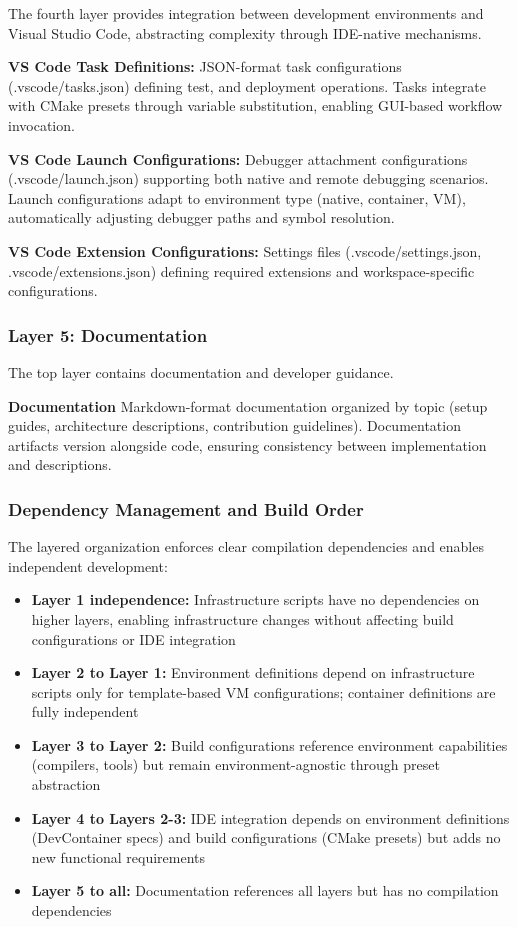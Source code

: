The fourth layer provides integration between development environments and Visual Studio Code, abstracting complexity through IDE-native mechanisms.

\textbf{VS Code Task Definitions:} JSON-format task configurations (.vscode/tasks.json) defining test, and deployment operations.
Tasks integrate with CMake presets through variable substitution, enabling GUI-based workflow invocation.

\begin{sloppypar}
\textbf{VS Code Launch Configurations:} Debugger attachment configurations (.vscode/launch.json) supporting both native and remote debugging scenarios.
Launch configurations adapt to environment type (native, container, VM), automatically adjusting debugger paths and symbol resolution.
\end{sloppypar}

\textbf{VS Code Extension Configurations:} Settings files (.vscode/settings.json, .vscode/extensions.json) defining required extensions and workspace-specific configurations.

\subsubsection{Layer 5: Documentation}

The top layer contains documentation and developer guidance.

\textbf{Documentation} Markdown-format documentation organized by topic (setup guides, architecture descriptions, contribution guidelines).
Documentation artifacts version alongside code, ensuring consistency between implementation and descriptions.

\subsubsection{Dependency Management and Build Order}

The layered organization enforces clear compilation dependencies and enables independent development:
\begin{itemize}
\item \textbf{Layer 1 independence:} Infrastructure scripts have no dependencies on higher layers, enabling infrastructure changes without affecting build configurations or IDE integration
\item \textbf{Layer 2 to Layer 1:} Environment definitions depend on infrastructure scripts only for template-based VM configurations; container definitions are fully independent
\item \textbf{Layer 3 to Layer 2:} Build configurations reference environment capabilities (compilers, tools) but remain environment-agnostic through preset abstraction
\item \textbf{Layer 4 to Layers 2-3:} IDE integration depends on environment definitions (DevContainer specs) and build configurations (CMake presets) but adds no new functional requirements
\item \textbf{Layer 5 to all:} Documentation references all layers but has no compilation dependencies
\end{itemize}

